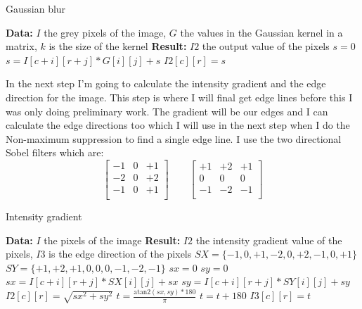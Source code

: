 \begin{algorithm}[H]
\caption{Gaussian blur}
\label{alg:gauss}
\begin{algorithmic}
\State \textbf{Data:} $I$ the grey pixels of the image, $G$ the values in the Gaussian kernel in a matrix, $k$ is the size of the kernel
\State \textbf{Result:} $I2$ the output value of the pixels
\State $s = 0$
\State $s = I[c + i ][r + j] * G[i][j] + s $
\EndFor
\EndFor
\State $I2[c][r] = s$
\EndFor
\end{algorithmic}
\end{algorithm}

In the next step I'm going to calculate the intensity gradient and the edge direction for the image. This step is where I will final get edge lines before this I was only doing preliminary work. The gradient will be our edges and I can calculate the edge directions too which I will use in the next step when I do the Non-maximum suppression to find a single edge line. I use the two directional Sobel filters which are:
\[
\begin{bmatrix}
-1 & 0 & +1 \\
-2 & 0 & +2 \\
-1 & 0 & +1 \\
\end{bmatrix} \qquad
\begin{bmatrix}
+1 & +2 & +1 \\
0 & 0 & 0 \\
-1 & -2 & -1 \\
\end{bmatrix}
\]

\begin{algorithm}[H]
\caption{Intensity gradient}
\label{alg:sobel}
\begin{algorithmic}
\State \textbf{Data:} $I$ the pixels of the image
\State \textbf{Result:} $I2$ the intensity gradient value of the pixels, $I3$ is the edge direction of the pixels
\State $SX = \{-1, 0, +1, -2, 0, +2, -1, 0, +1\}$
\State $SY = \{+1, +2, +1, 0, 0, 0, -1, -2, -1\}$
\State $sx = 0$
\State $sy = 0$
\State $sx = I[c + i ][r + j] * SX[i][j] + sx $
\State $sy = I[c + i ][r + j] * SY[i][j] + sy $
\EndFor
\EndFor
\State $I2[c][r] = \sqrt{sx^2+sy^2}$
\State $t = \frac{\text{atan2}(sx,sy) * 180}{\pi} $
\State $t = t + 180$
\EndIf
\State $I3[c][r] = t$
\EndFor
\end{algorithmic}
\end{algorithm}
\clearpage


